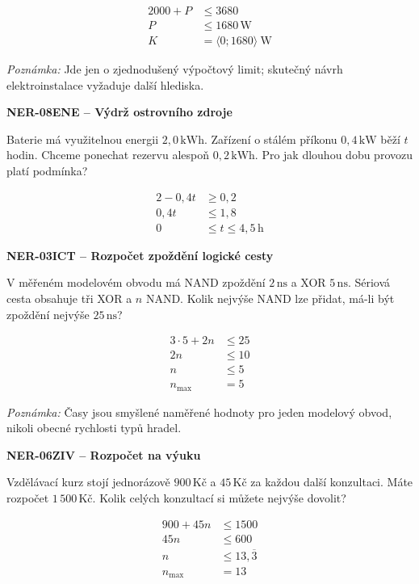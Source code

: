 \documentclass[11pt,a4paper]{article}
\begin{document}
\par\[\begin{aligned}
2000+P&\le3680\\P&\le1680\,\mathrm W\\K&=\langle0;1680\rangle\ \mathrm W
\end{aligned}\]
\par\textit{Poznámka:} Jde jen o zjednodušený výpočtový limit; skutečný návrh elektroinstalace vyžaduje další hlediska.
\par\medskip\noindent
\textbf{NER-08}\quad\textbf{ENE -- Výdrž ostrovního zdroje}\par
Baterie má využitelnou energii $2{,}0\,\mathrm{kWh}$. Zařízení o stálém příkonu $0{,}4\,\mathrm{kW}$ běží $t$ hodin. Chceme ponechat rezervu alespoň $0{,}2\,\mathrm{kWh}$. Pro jak dlouhou dobu provozu platí podmínka?
\par\[\begin{aligned}
2-0{,}4t&\ge0{,}2\\0{,}4t&\le1{,}8\\0&\le t\le4{,}5\,\mathrm h
\end{aligned}\]
\par\medskip\noindent
\textbf{NER-03}\quad\textbf{ICT -- Rozpočet zpoždění logické cesty}\par
V měřeném modelovém obvodu má NAND zpoždění $2\,\mathrm{ns}$ a XOR $5\,\mathrm{ns}$. Sériová cesta obsahuje tři XOR a $n$ NAND. Kolik nejvýše NAND lze přidat, má-li být zpoždění nejvýše $25\,\mathrm{ns}$?
\par\[\begin{aligned}
3\cdot5+2n&\le25\\2n&\le10\\n&\le5\\n_{\max}&=5
\end{aligned}\]
\par\textit{Poznámka:} Časy jsou smyšlené naměřené hodnoty pro jeden modelový obvod, nikoli obecné rychlosti typů hradel.
\par\medskip\noindent
\textbf{NER-06}\quad\textbf{ZIV -- Rozpočet na výuku}\par
Vzdělávací kurz stojí jednorázově $900\,\text{Kč}$ a $45\,\text{Kč}$ za každou další konzultaci. Máte rozpočet $1\,500\,\text{Kč}$. Kolik celých konzultací si můžete nejvýše dovolit?
\par\[\begin{aligned}
900+45n&\le1500\\45n&\le600\\n&\le13{,}\overline3\\n_{\max}&=13
\end{aligned}\]
\end{document}
